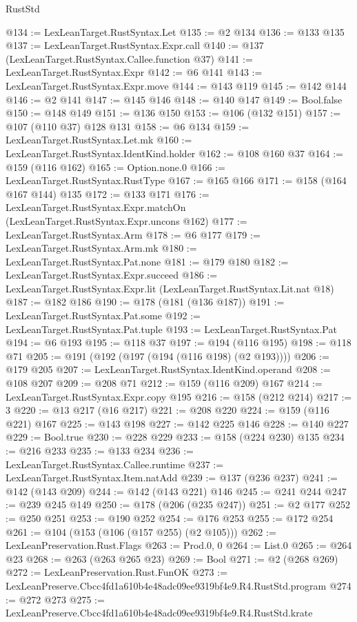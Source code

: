 \begin{lexlean}{RustStd}
\begin{coremodule}
@134 := LexLeanTarget.RustSyntax.Let
@135 := @2 @134
@136 := @133 @135
@137 := LexLeanTarget.RustSyntax.Expr.call
@140 := @137 (LexLeanTarget.RustSyntax.Callee.function @37)
@141 := LexLeanTarget.RustSyntax.Expr
@142 := @6 @141
@143 := LexLeanTarget.RustSyntax.Expr.move
@144 := @143 @119
@145 := @142 @144
@146 := @2 @141
@147 := @145 @146
@148 := @140 @147
@149 := Bool.false
@150 := @148 @149
@151 := @136 @150
@153 := @106 (@132 @151)
@157 := @107 (@110 @37) @128 @131
@158 := @6 @134
@159 := LexLeanTarget.RustSyntax.Let.mk
@160 := LexLeanTarget.RustSyntax.IdentKind.holder
@162 := @108 @160 @37
@164 := @159 (@116 @162)
@165 := Option.none.{0}
@166 := LexLeanTarget.RustSyntax.RustType
@167 := @165 @166
@171 := @158 (@164 @167 @144) @135
@172 := @133 @171
@176 := LexLeanTarget.RustSyntax.Expr.matchOn (LexLeanTarget.RustSyntax.Expr.uncons @162)
@177 := LexLeanTarget.RustSyntax.Arm
@178 := @6 @177
@179 := LexLeanTarget.RustSyntax.Arm.mk
@180 := LexLeanTarget.RustSyntax.Pat.none
@181 := @179 @180
@182 := LexLeanTarget.RustSyntax.Expr.succeed
@186 := LexLeanTarget.RustSyntax.Expr.lit (LexLeanTarget.RustSyntax.Lit.nat @18)
@187 := @182 @186
@190 := @178 (@181 (@136 @187))
@191 := LexLeanTarget.RustSyntax.Pat.some
@192 := LexLeanTarget.RustSyntax.Pat.tuple
@193 := LexLeanTarget.RustSyntax.Pat
@194 := @6 @193
@195 := @118 @37
@197 := @194 (@116 @195)
@198 := @118 @71
@205 := @191 (@192 (@197 (@194 (@116 @198) (@2 @193))))
@206 := @179 @205
@207 := LexLeanTarget.RustSyntax.IdentKind.operand
@208 := @108 @207
@209 := @208 @71
@212 := @159 (@116 @209) @167
@214 := LexLeanTarget.RustSyntax.Expr.copy @195
@216 := @158 (@212 @214)
@217 := 3
@220 := @13 @217 (@16 @217)
@221 := @208 @220
@224 := @159 (@116 @221) @167
@225 := @143 @198
@227 := @142 @225 @146
@228 := @140 @227
@229 := Bool.true
@230 := @228 @229
@233 := @158 (@224 @230) @135
@234 := @216 @233
@235 := @133 @234
@236 := LexLeanTarget.RustSyntax.Callee.runtime
@237 := LexLeanTarget.RustSyntax.Item.natAdd
@239 := @137 (@236 @237)
@241 := @142 (@143 @209)
@244 := @142 (@143 @221) @146
@245 := @241 @244
@247 := @239 @245 @149
@250 := @178 (@206 (@235 @247))
@251 := @2 @177
@252 := @250 @251
@253 := @190 @252
@254 := @176 @253
@255 := @172 @254
@261 := @104 (@153 (@106 (@157 @255) (@2 @105)))
@262 := LexLeanPreservation.Rust.Flags
@263 := Prod.{0, 0}
@264 := List.{0}
@265 := @264 @23
@268 := @263 (@263 @265 @23)
@269 := Bool
@271 := @2 (@268 @269)
@272 := LexLeanPreservation.Rust.FunOK
@273 := LexLeanPreserve.Cbcc4fd1a610b4e48adc09ee9319bf4e9.R4.RustStd.program
@274 := @272 @273
@275 := LexLeanPreserve.Cbcc4fd1a610b4e48adc09ee9319bf4e9.R4.RustStd.krate

\end{coremodule}
\end{lexlean}
